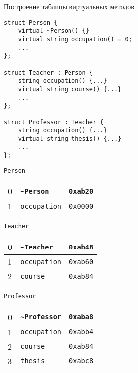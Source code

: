\documentclass{beamer}
\begin{document}
\begin{frame}[fragile]{Построение таблицы виртуальных методов}
    \begin{minipage}{.55\textwidth}
        \begin{lstlisting}[basicstyle=\fontsize{8pt}{1em}\ttfamily]
struct Person {
    virtual ~Person() {}
    virtual string occupation() = 0;
    ...
};

struct Teacher : Person {
    string occupation() {...}
    virtual string course() {...}
    ...
};

struct Professor : Teacher {
    string occupation() {...}
    virtual string thesis() {...}
    ...
};
    \end{lstlisting}
\end{minipage}\hspace{2mm}
\begin{minipage}{3cm}
    {\tt Person}
    \begin{tabular}{|l|l|l|}
        \hline
        0 & \texttt{\textasciitilde{}Person}  & \texttt{0xab20} \\\hline
        1 & \texttt{occupation}                & \texttt{0x0000} \\\hline
    \end{tabular}
    \vspace{1em}

    {\tt Teacher}
    \begin{tabular}{|l|l|l|}
        \hline
        0 & \texttt{\textasciitilde{}Teacher} & \texttt{0xab48} \\\hline
        1 & \texttt{occupation}                & \texttt{0xab60} \\\hline
        2 & \texttt{course}                   & \texttt{0xab84}  \\\hline
    \end{tabular}
    \vspace{1em}

    {\tt Professor}
    \begin{tabular}{|l|l|l|}
        \hline
        0 & \texttt{\textasciitilde{}Professor} & \texttt{0xaba8} \\\hline
        1 & \texttt{occupation}& \texttt{0xabb4} \\\hline
        2 & \texttt{course}   & \texttt{0xab84} \\\hline
        3 & \texttt{thesis}   & \texttt{0xabc8} \\\hline
    \end{tabular}
\end{minipage}
\end{frame}
\end{document}
